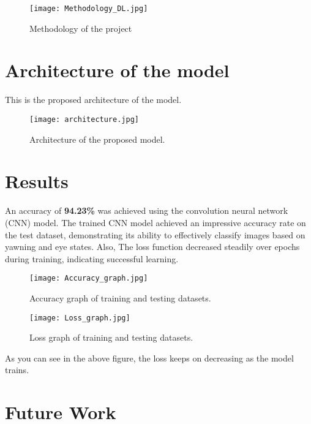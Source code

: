 \documentclass[conference]{IEEEtran}
\begin{document}
\begin{figure}[h]
    \centering %
    \texttt{[image: Methodology\_DL.jpg]} 
    \caption{Methodology of the project} 
    \label{fig:example} %
\end{figure}

\section{Architecture of the model}
This is the proposed architecture of the model.

\begin{figure}[h]
    \centering %
    \texttt{[image: architecture.jpg]} 
    \caption{Architecture of the proposed model.} 
    \label{fig:example} %
\end{figure}

\section{Results}
An accuracy of \textbf{94.23\%} was achieved using the convolution neural network (CNN) model. The trained CNN model achieved an impressive accuracy rate on the test dataset, demonstrating its ability to effectively classify images based on yawning and eye states. Also, The loss function decreased steadily over epochs during training, indicating successful learning. 

\begin{figure}[h]
    \centering %
    \texttt{[image: Accuracy\_graph.jpg]} 
    \caption{Accuracy graph of training and testing datasets.} 
    \label{fig:example} %
\end{figure}

\begin{figure}[h]
    \centering %
    \texttt{[image: Loss\_graph.jpg]} 
    \caption{Loss graph of training and testing datasets.} 
    \label{fig:example} %
\end{figure}

As you can see in the above figure, the loss keeps on decreasing as the model trains.

\section{Future Work}
\end{document}
